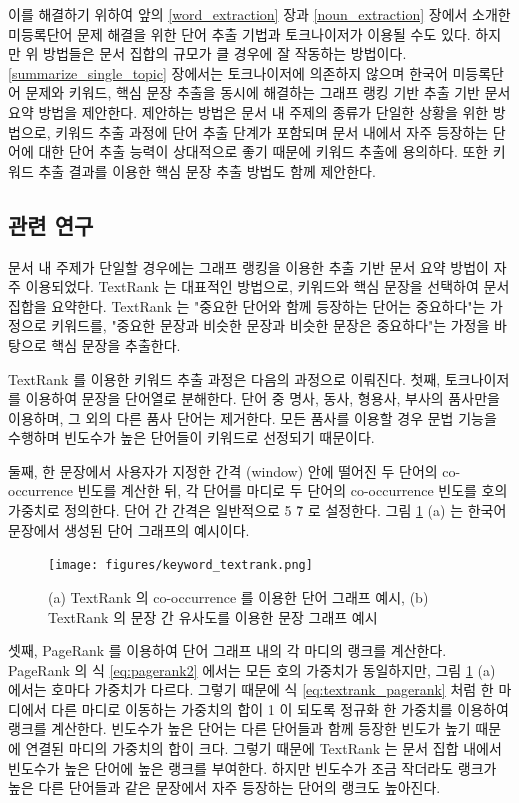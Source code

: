 \documentclass[11pt]{article}
\begin{document}
이를 해결하기 위하여 앞의 \ref{word_extraction} 장과 \ref{noun_extraction} 장에서 소개한 미등록단어 문제 해결을 위한 단어 추출 기법과 토크나이저가 이용될 수도 있다.
하지만 위 방법들은 문서 집합의 규모가 클 경우에 잘 작동하는 방법이다.
\ref{summarize_single_topic} 장에서는 토크나이저에 의존하지 않으며 한국어 미등록단어 문제와 키워드, 핵심 문장 추출을 동시에 해결하는 그래프 랭킹 기반 추출 기반 문서 요약 방법을 제안한다.
제안하는 방법은 문서 내 주제의 종류가 단일한 상황을 위한 방법으로, 키워드 추출 과정에 단어 추출 단계가 포함되며 문서 내에서 자주 등장하는 단어에 대한 단어 추출 능력이 상대적으로 좋기 때문에 키워드 추출에 용의하다.
또한 키워드 추출 결과를 이용한 핵심 문장 추출 방법도 함께 제안한다.

\subsection{관련 연구}

문서 내 주제가 단일할 경우에는 그래프 랭킹을 이용한 추출 기반 문서 요약 방법이 자주 이용되었다.
TextRank \citep{mihalcea2004textrank} 는 대표적인 방법으로, 키워드와 핵심 문장을 선택하여 문서 집합을 요약한다.
TextRank 는 "중요한 단어와 함께 등장하는 단어는 중요하다"는 가정으로 키워드를, "중요한 문장과 비슷한 문장과 비슷한 문장은 중요하다"는 가정을 바탕으로 핵심 문장을 추출한다.

TextRank 를 이용한 키워드 추출 과정은 다음의 과정으로 이뤄진다.
첫째, 토크나이저를 이용하여 문장을 단어열로 분해한다.
단어 중 명사, 동사, 형용사, 부사의 품사만을 이용하며, 그 외의 다른 품사 단어는 제거한다.
모든 품사를 이용할 경우 문법 기능을 수행하며 빈도수가 높은 단어들이 키워드로 선정되기 때문이다.

둘째, 한 문장에서 사용자가 지정한 간격 (window) 안에 떨어진 두 단어의 co-occurrence 빈도를 계산한 뒤, 각 단어를 마디로 두 단어의 co-occurrence 빈도를 호의 가중치로 정의한다.
단어 간 간격은 일반적으로 5 \~ 7 로 설정한다.
그림 \ref{fig:textrank} (a) 는 한국어 문장에서 생성된 단어 그래프의 예시이다.

\begin{figure}[H]
\centering
\texttt{[image: figures/keyword\_textrank.png]}
\caption{(a) TextRank 의 co-occurrence 를 이용한 단어 그래프 예시, (b) TextRank 의 문장 간 유사도를 이용한 문장 그래프 예시}
\label{fig:textrank}
\end{figure}

셋째, PageRank \citep{ilprints422} 를 이용하여 단어 그래프 내의 각 마디의 랭크를 계산한다.
PageRank 의 식 \ref{eq:pagerank2} 에서는 모든 호의 가중치가 동일하지만, 그림 \ref{fig:textrank} (a) 에서는 호마다 가중치가 다르다.
그렇기 때문에 식 \ref{eq:textrank_pagerank} 처럼 한 마디에서 다른 마디로 이동하는 가중치의 합이 1 이 되도록 정규화 한 가중치를 이용하여 랭크를 계산한다.
빈도수가 높은 단어는 다른 단어들과 함께 등장한 빈도가 높기 때문에 연결된 마디의 가중치의 합이 크다.
그렇기 때문에 TextRank 는 문서 집합 내에서 빈도수가 높은 단어에 높은 랭크를 부여한다.
하지만 빈도수가 조금 작더라도 랭크가 높은 다른 단어들과 같은 문장에서 자주 등장하는 단어의 랭크도 높아진다.
\end{document}
